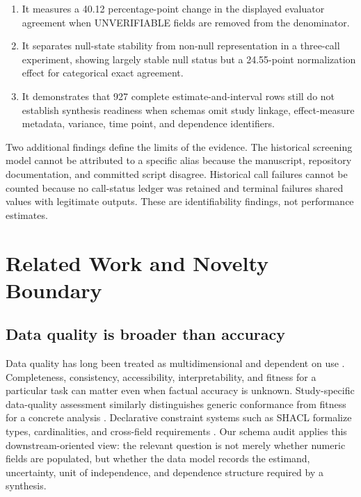\documentclass[acmsmall,anonymous,review]{acmart}
\begin{document}
\begin{enumerate}[leftmargin=*,itemsep=2pt]
  \item It measures a 40.12 percentage-point change in the displayed evaluator agreement when UNVERIFIABLE fields are removed from the denominator.
  \item It separates null-state stability from non-null representation in a three-call experiment, showing largely stable null status but a 24.55-point normalization effect for categorical exact agreement.
  \item It demonstrates that 927 complete estimate-and-interval rows still do not establish synthesis readiness when schemas omit study linkage, effect-measure metadata, variance, time point, and dependence identifiers.
\end{enumerate}

Two additional findings define the limits of the evidence. The historical screening model cannot be attributed to a specific alias because the manuscript, repository documentation, and committed script disagree. Historical call failures cannot be counted because no call-status ledger was retained and terminal failures shared values with legitimate outputs. These are identifiability findings, not performance estimates.

\section{Related Work and Novelty Boundary}

\subsection{Data quality is broader than accuracy}

Data quality has long been treated as multidimensional and dependent on use \cite{wang1996beyond}. Completeness, consistency, accessibility, interpretability, and fitness for a particular task can matter even when factual accuracy is unknown. Study-specific data-quality assessment similarly distinguishes generic conformance from fitness for a concrete analysis \cite{preserve2024}. Declarative constraint systems such as SHACL formalize types, cardinalities, and cross-field requirements \cite{shacl2017}. Our schema audit applies this downstream-oriented view: the relevant question is not merely whether numeric fields are populated, but whether the data model records the estimand, uncertainty, unit of independence, and dependence structure required by a synthesis.
\end{document}

